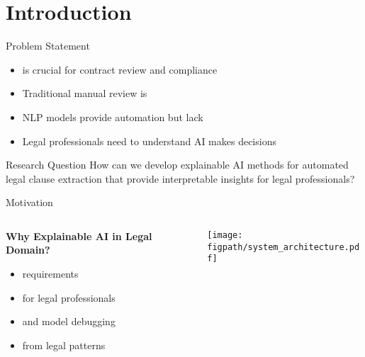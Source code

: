 
\section{Introduction}

\begin{frame}{Problem Statement}
\begin{itemize}
    \item {} is crucial for contract review and compliance
    \item Traditional manual review is 
    \item NLP models provide automation but lack 
    \item Legal professionals need to understand  AI makes decisions
\end{itemize}

\vspace{0.5cm}
\begin{alertblock}{Research Question}
How can we develop explainable AI methods for automated legal clause extraction that provide interpretable insights for legal professionals?
\end{alertblock}
\end{frame}

\begin{frame}{Motivation}
\begin{columns}
\begin{column}{0.6\textwidth}
\textbf{Why Explainable AI in Legal Domain?}
\begin{itemize}
    \item {} requirements
    \item {} for legal professionals
    \item {} and model debugging
    \item {} from legal patterns
\end{itemize}
\end{column}
\begin{column}{0.4\textwidth}
\begin{center}
\texttt{[image: \\figpath/system\_architecture.pdf]}
\end{center}
\end{column}
\end{columns}
\end{frame}

